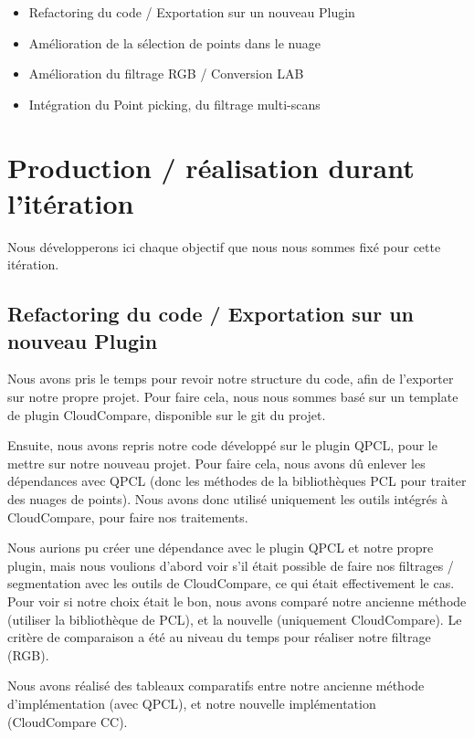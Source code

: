 \documentclass[12pt,titlepage,french]{article}
\begin{document}
\begin{itemize}
  \item Refactoring du code / Exportation sur un nouveau Plugin
  \item Amélioration de la sélection de points dans le nuage
  \item Amélioration du filtrage RGB / Conversion LAB
  \item Intégration du Point picking, du filtrage multi-scans
\end{itemize}

\section{Production / réalisation durant l'itération}

Nous développerons ici chaque objectif que nous nous sommes fixé pour cette itération.

\subsection{Refactoring du code / Exportation sur un nouveau Plugin}

Nous avons pris le temps pour revoir notre structure du code, afin de l'exporter sur notre propre projet. Pour faire cela, nous nous sommes basé sur un template de plugin CloudCompare, disponible sur le git du projet. \newline

Ensuite, nous avons repris notre code développé sur le plugin QPCL, pour le mettre sur notre nouveau projet. Pour faire cela, nous avons dû enlever les dépendances avec QPCL (donc les méthodes de la bibliothèques PCL pour traiter des nuages de points). Nous avons donc utilisé uniquement les outils intégrés à CloudCompare, pour faire nos traitements. \newline

Nous aurions pu créer une dépendance avec le plugin QPCL et notre propre plugin, mais nous voulions d'abord voir s'il était possible de faire nos filtrages / segmentation avec les outils de CloudCompare, ce qui était effectivement le cas. Pour voir si notre choix était le bon, nous avons comparé notre ancienne méthode (utiliser la bibliothèque de PCL), et la nouvelle (uniquement CloudCompare). Le critère de comparaison a été au niveau du temps pour réaliser notre filtrage (RGB). \newline

Nous avons réalisé des tableaux comparatifs entre notre ancienne méthode d'implémentation (avec QPCL), et notre nouvelle implémentation (CloudCompare CC). \newline
\end{document}
